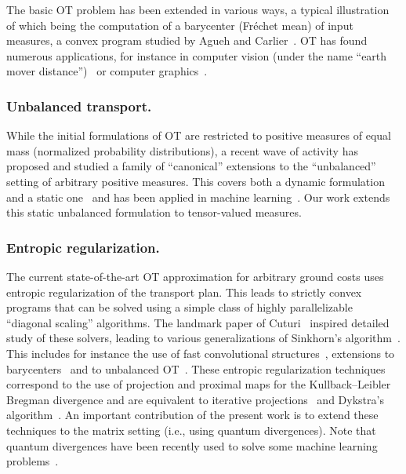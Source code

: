 The basic OT problem has been extended in various ways, a typical illustration of which being the computation of a barycenter (Fr\'echet mean) of input measures, a convex program studied by Agueh and Carlier~.
%
OT has found numerous applications, for instance in computer vision (under the name ``earth mover distance'')~\cite{rubner-2000} or computer graphics~\cite{bonneel-2011}. %


\subsubsection{Unbalanced transport.}

While the initial formulations of OT are restricted to positive measures of equal mass (normalized probability distributions), a recent wave of activity has proposed and studied a family of ``canonical'' extensions %
to the ``unbalanced'' setting of arbitrary positive measures. This covers both a dynamic formulation~\cite{LieroMielkeSavareCourt,kondratyev2015,2016-chizat-focm} and a static one~\cite{LieroMielkeSavareLong,2015-chizat-unbalanced} and has been applied in machine learning~\cite{frogner-2015}. 
%
Our work extends this static unbalanced formulation to tensor-valued measures. 


\subsubsection{Entropic regularization.}

The current state-of-the-art OT approximation for arbitrary ground costs uses entropic regularization of the transport plan. This leads to strictly convex programs that can be solved using a simple class of highly parallelizable ``diagonal scaling'' algorithms. The landmark paper of Cuturi~ inspired detailed study of these solvers, leading to various generalizations of Sinkhorn's algorithm~. This includes for instance the use of fast convolutional structures~\cite{solomon-2015}, extensions to barycenters~\cite{benamou-2015} and to unbalanced OT~\cite{frogner-2015,2016-chizat-sinkhorn}.
%
These entropic regularization techniques correspond to the use of projection and proximal maps for the Kullback--Leibler Bregman divergence and are equivalent to iterative projections~\cite{bregman-1967} and Dykstra's algorithm~\cite{Dykstra83,bauschke-lewis}. 
%
An important contribution of the present work is to extend these techniques to the matrix setting (i.e., using quantum divergences). Note that quantum divergences have been recently used to solve some machine learning problems~\cite{Dhillon2008,Kulis2009,Chandrasekaran2016}.%


